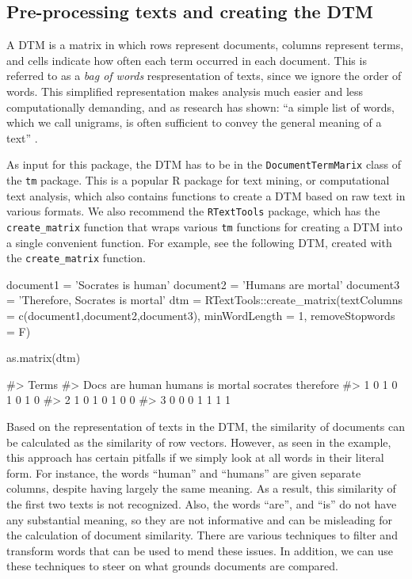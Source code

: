 \subsection{Pre-processing texts and creating the DTM}

A DTM is a matrix in which rows represent documents, columns represent
terms, and cells indicate how often each term occurred in each document.
This is referred to as a \emph{bag of words} respresentation of texts,
since we ignore the order of words. This simplified representation makes
analysis much easier and less computationally demanding, and as research
has shown: ``a simple list of words, which we call unigrams, is often
sufficient to convey the general meaning of a text''
\citep[6]{grimmer13}.

As input for this package, the DTM has to be in the
\texttt{DocumentTermMarix} class of the \texttt{tm} package. This is a
popular R package for text mining, or computational text analysis, which
also contains functions to create a DTM based on raw text in various
formats. We also recommend the \texttt{RTextTools} package, which has
the \texttt{create\_matrix} function that wraps various \texttt{tm}
functions for creating a DTM into a single convenient function. For
example, see the following DTM, created with the \texttt{create\_matrix}
function.

\begin{Schunk}
\begin{Sinput}
document1 = 'Socrates is human'
document2 = 'Humans are mortal'
document3 = 'Therefore, Socrates is mortal'
dtm = RTextTools::create_matrix(textColumns = c(document1,document2,document3), 
                                minWordLength = 1, removeStopwords = F)

as.matrix(dtm)
\end{Sinput}
\begin{Soutput}
#>     Terms
#> Docs are human humans is mortal socrates therefore
#>    1   0     1      0  1      0        1         0
#>    2   1     0      1  0      1        0         0
#>    3   0     0      0  1      1        1         1
\end{Soutput}
\end{Schunk}

Based on the representation of texts in the DTM, the similarity of
documents can be calculated as the similarity of row vectors. However,
as seen in the example, this approach has certain pitfalls if we simply
look at all words in their literal form. For instance, the words
``human'' and ``humans'' are given separate columns, despite having
largely the same meaning. As a result, this similarity of the first two
texts is not recognized. Also, the words ``are'', and ``is'' do not have
any substantial meaning, so they are not informative and can be
misleading for the calculation of document similarity. There are various
techniques to filter and transform words that can be used to mend these
issues. In addition, we can use these techniques to steer on what
grounds documents are compared.

